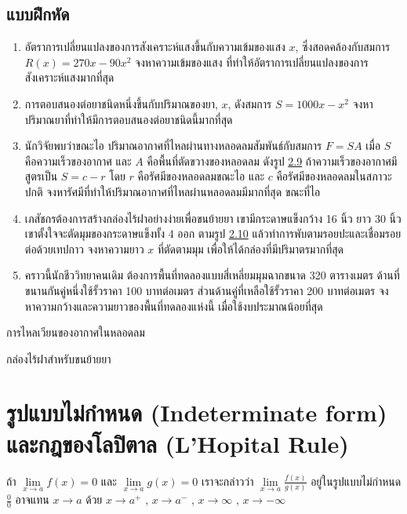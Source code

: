 \documentclass[
]{book}
\begin{document}
\subsection{แบบฝึกหัด}\label{uxe41uxe1auxe1auxe1duxe01uxe2buxe14-6}

\begin{enumerate}
\def\labelenumi{\arabic{enumi}.}
\item
  อัตราการเปลี่ยนแปลงของการสังเคราะห์แสงขึ้นกับความเข้มของแสง \(x\),
  ซึ่งสอดคล้องกับสมการ \(R(x)=270x-90x^2\) จงหาความเข้มของแสง
  ที่ทำให้อัตราการเปลี่ยนแปลงของการสังเคราะห์แสงมากที่สุด
\item
  การตอบสนองต่อยาชนิดหนึ่งขึ้นกับปริมาณของยา, \(x\), ดังสมการ \(S=1000x-x^2\)
  จงหาปริมาณยาที่ทำให้มีการตอบสนองต่อยาชนิดนี้มากที่สุด
\item
  นักวิจัยพบว่าขณะไอ ปริมาณอากาศที่ไหลผ่านทางหลอดลมสัมพันธ์กับสมการ \(F=SA\) เมื่อ
  \(S\) คือความเร็วของอากาศ และ \(A\) คือพื้นที่ตัดขวางของหลอดลม ดังรูป
  \hyperref[fig-artery]{2.9} ถ้าความเร็วของอากาศมีสูตรเป็น \(S=c-r\) โดย
  \(r\) คือรัศมีของหลอดลมขณะไอ และ \(c\) คือรัศมีของหลอดลมในสภาวะปกติ
  จงหารัศมีที่ทำให้ปริมาณอากาศที่ไหลผ่านหลอดลมมีมากที่สุด ขณะที่ไอ
\item
  เภสัชกรต้องการสร้างกล่องไร้ฝาอย่างง่ายเพื่อขนย้ายยา เขามีกระดาษแข็งกว้าง 16 นิ้ว ยาว
  30 นิ้ว เขาตั้งใจจะตัดมุมของกระดาษแข็งทั้ง 4 ออก ตามรูป
  \hyperref[fig-box-area]{2.10} แล้วทำการพับตามรอยปะและเชื่อมรอยต่อด้วยเทปกาว
  จงหาความยาว \(x\) ที่ตัดตามมุม เพื่อให้ได้กล่องที่มีปริมาตรมากที่สุด
\item
  คราวนี้นักชีววิทยาคนเดิม ต้องการพื้นที่ทดลองแบบสี่เหลี่ยมมุมฉากขนาด 320 ตารางเมตร
  ด้านที่ขนานกันคู่หนึ่งใช้รั้วราคา 100 บาทต่อเมตร ส่วนด้านคู่ที่เหลือใช้รั้วราคา 200
  บาทต่อเมตร จงหาความกว้างและความยาวของพื้นที่ทดลองแห่งนี้ เมื่อใช้งบประมาณน้อยที่สุด
\end{enumerate}

การไหลเวียนของอากาศในหลอดลม

กล่องไร้ฝาสำหรับขนย้ายยา

\section{รูปแบบไม่กำหนด (Indeterminate form) และกฎของโลปิตาล (L'Hopital
Rule)}\label{uxe23uxe1buxe41uxe1auxe1auxe44uxe21uxe01uxe33uxe2buxe19uxe14-indeterminate-form-uxe41uxe25uxe30uxe01uxe0euxe02uxe2duxe07uxe42uxe25uxe1buxe15uxe32uxe25-lhopital-rule}

ถ้า \(\mathop {\lim }\limits_{x\to a} f(x)=0\) และ
\(\displaystyle \mathop
{\lim
}\limits_{x\to a} g(x)=0\) เราจะกล่าวว่า \(\displaystyle \mathop {\lim
}\limits_{x\to a}
\frac{f(x)}{g(x)}\) อยู่ในรูปแบบไม่กำหนด \(\displaystyle \frac{0}{0}\)
อาจแทน \(x\to a\) ด้วย \(x\to a^+\) , \(x\to a^-\) , \(x\to \infty\) ,
\(x\to -\infty\)
\end{document}
